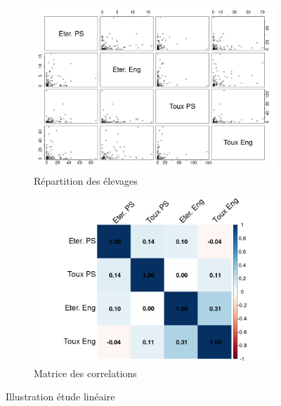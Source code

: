 \documentclass{article}
\begin{document}
\begin{figure}[htbp]
    \centering
    \begin{subfigure}[b]{0.49\textwidth}
        \centering
        \includegraphics[width=\textwidth]{img_var_resp/points_corr_lin.png}
        \caption{Répartition des élevages}\label{fig:disp_lin}
    \end{subfigure}
    \hspace{0.1cm}
    \begin{subfigure}[b]{0.49\textwidth}
        \centering
        \includegraphics[width=\textwidth]{img_var_resp/corrplot_corr_lin.png}
        \caption{Matrice des correlations}\label{fig:corr_mat_lin}
    \end{subfigure}
    \caption{Illustration étude linéaire}\label{fig:etu_lin}
\end{figure}
\end{document}
